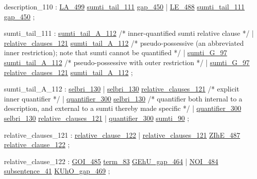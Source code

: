 \label{html:y110}
description_110         :  \hyperref[html:y499]{LA_499}  \hyperref[html:y111]{sumti_tail_111}  \hyperref[html:y450]{gap_450}
                        |  \hyperref[html:y488]{LE_488}  \hyperref[html:y111]{sumti_tail_111}  \hyperref[html:y450]{gap_450}
                        ;

\label{html:y111}
sumti_tail_111          :  \hyperref[html:y112]{sumti_tail_A_112}
                           /* inner-quantified sumti relative clause */
                        |  \hyperref[html:y121]{relative_clauses_121}  \hyperref[html:y112]{sumti_tail_A_112}
                           /* pseudo-possessive
                              (an abbreviated inner restriction);
                              note that sumti cannot be quantified */
                        |  \hyperref[html:y97]{sumti_G_97}  \hyperref[html:y112]{sumti_tail_A_112}
                           /* pseudo-possessive with outer restriction */
                        |  \hyperref[html:y97]{sumti_G_97}  \hyperref[html:y121]{relative_clauses_121}  \hyperref[html:y112]{sumti_tail_A_112}
                        ;

\label{html:y112}
sumti_tail_A_112        :  \hyperref[html:y130]{selbri_130}
                        |  \hyperref[html:y130]{selbri_130}  \hyperref[html:y121]{relative_clauses_121}
                           /* explicit inner quantifier */
                        |  \hyperref[html:y300]{quantifier_300}  \hyperref[html:y130]{selbri_130}
                           /* quantifier both internal to a description,
                              and external to a sumti thereby made specific */
                        |  \hyperref[html:y300]{quantifier_300}  \hyperref[html:y130]{selbri_130}  \hyperref[html:y121]{relative_clauses_121}
                        |  \hyperref[html:y300]{quantifier_300}  \hyperref[html:y90]{sumti_90}
                        ;

\label{html:y121}
relative_clauses_121    :  \hyperref[html:y122]{relative_clause_122}
                        |  \hyperref[html:y121]{relative_clauses_121}  \hyperref[html:y487]{ZIhE_487}  \hyperref[html:y122]{relative_clause_122}
                        ;

\label{html:y122}
relative_clause_122     :  \hyperref[html:y485]{GOI_485}  \hyperref[html:y83]{term_83}  \hyperref[html:y464]{GEhU_gap_464}
                        |  \hyperref[html:y484]{NOI_484}  \hyperref[html:y41]{subsentence_41}  \hyperref[html:y469]{KUhO_gap_469}
                        ;

